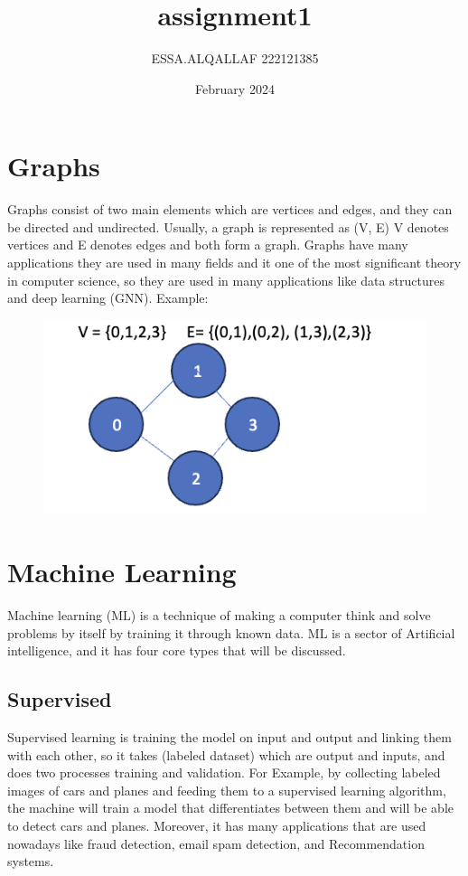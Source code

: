\documentclass{article}
\title{assignment1}
\author{ESSA.ALQALLAF    222121385}
\date{February 2024}
\begin{document}
\maketitle

\section{Graphs}
Graphs consist of two main elements which are vertices and edges, and they can be directed and undirected.  Usually, a graph is represented as (V, E) V denotes vertices and E denotes edges and both form a graph. Graphs have many applications they are used in many fields and it one of the most significant theory in computer science, so they are used in many applications like data structures and deep learning (GNN).  
Example:
\begin{figure}[H]

    \centering
    \includegraphics[width = \linewidth]{aa1.png}
    
\end{figure}

\section{Machine Learning}
Machine learning (ML) is a technique of making a computer think and solve problems by itself by training it through known data.  ML is a sector of Artificial intelligence, and it has four core types that will be discussed.
\subsection{Supervised}
Supervised learning is training the model on input and output and linking them with each other, so it takes (labeled dataset) which are output and inputs, and does two processes training and validation. For Example, by collecting labeled images of cars and planes and feeding them to a supervised learning algorithm, the machine will train a model that differentiates between them and will be able to detect cars and planes. Moreover, it has many applications that are used nowadays like fraud detection, email spam detection, and Recommendation systems.
\end{document}
